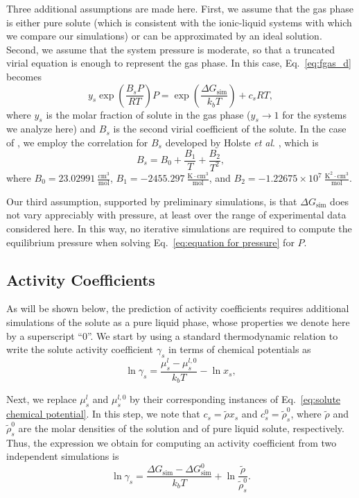 \documentclass[3p,twocolumn]{elsarticle}
\begin{document}
Three additional assumptions are made here. First, we assume that the gas phase is either pure solute (which is consistent with the ionic-liquid systems with which we compare our simulations) or can be approximated by an ideal solution. Second, we assume that the system pressure is moderate, so that a truncated virial equation is enough to represent the gas phase. In this case, Eq.~\eqref{eq:fgas_d} becomes
\begin{equation}
\label{eq:equation for pressure}
y_s \exp\left( \frac{B_s P}{R T} \right) P = \exp \left( \frac{\Delta G_\text{sim}}{k_b T} \right) +  c_s R T,
\end{equation}
where $y_s$ is the molar fraction of solute in the gas phase ($y_s \rightarrow 1$ for the systems we analyze here) and $B_s$ is the second virial coefficient of the solute.
In the case of , we employ the correlation for $B_s$ developed by Holste \textit{et al}. \cite{Holste_1987}, which is
\begin{equation}
B_s = B_0 + \frac{B_1}{T} + \frac{B_2}{T^2},
\end{equation}
where $B_0 = 23.02991~\mathrm{\frac{cm^3}{mol}}$, $B_1 = -2455.297~\mathrm{\frac{K \cdot cm^3}{mol}}$, and $B_2 = -1.22675 \times 10^7~\mathrm{\frac{K^2 \cdot cm^3}{mol}}$.

Our third assumption, supported by preliminary simulations, is that $\Delta G_\text{sim}$ does not vary appreciably with pressure, at least over the range of experimental data considered here.
In this way, no iterative simulations are required to compute the equilibrium pressure when solving Eq.~\eqref{eq:equation for pressure} for $P$.

\subsection*{Activity Coefficients}

As will be shown below, the prediction of activity coefficients requires additional simulations of the solute as a pure liquid phase, whose properties we denote here by a superscript ``$0$''.
We start by using a standard thermodynamic relation \cite{Tester} to write the solute activity coefficient $\gamma_s$ in terms of chemical potentials as
\begin{equation}
\label{eq:gamma}
\ln \gamma_s = \frac{\mu_s^l - \mu_s^{l,0}}{k_b T} - \ln x_s,
\end{equation}

Next, we replace $\mu_s^l$ and $\mu_s^{l,0}$ by their corresponding instances of Eq.~\eqref{eq:solute chemical potential}. In this step, we note that $c_s = \tilde{\rho} x_s$ and $c_s^0 = \tilde{\rho}_s^0$, where $\tilde{\rho}$ and $\tilde{\rho}_s^0$ are the molar densities of the solution and of pure liquid solute, respectively. Thus, the expression we obtain for computing an activity coefficient from two independent simulations is
\begin{equation}
\ln \gamma_s = \frac{\Delta G_\text{sim} - \Delta G_\text{sim}^{0}}{k_b T} + \ln \frac{\tilde{\rho}}{\tilde{\rho}_s^0}.
\end{equation}
\end{document}
